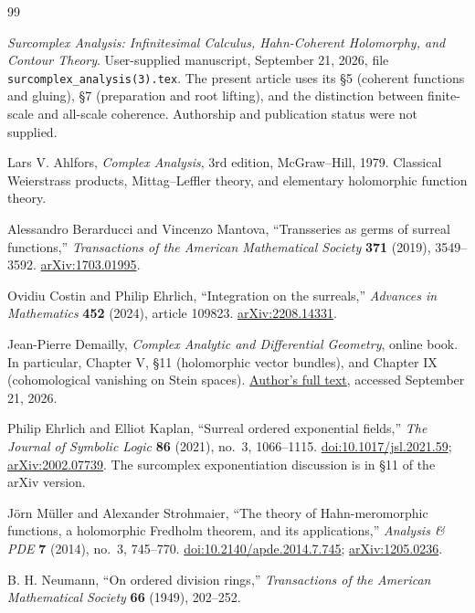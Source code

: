 \documentclass[11pt,letterpaper]{article}
\theoremstyle{definition}
\theoremstyle{remark}
\numberwithin{equation}{section}
\begin{document}
\begin{thebibliography}{99}

\emph{Surcomplex Analysis: Infinitesimal Calculus, Hahn-Coherent Holomorphy, and Contour Theory}.
User-supplied manuscript, September 21, 2026, file
\texttt{surcomplex\_analysis(3).tex}.
The present article uses its \S5 (coherent functions and gluing), \S7 (preparation and root lifting), and the distinction between finite-scale and all-scale coherence. Authorship and publication status were not supplied.

Lars V. Ahlfors,
\emph{Complex Analysis}, 3rd edition,
McGraw--Hill, 1979.
Classical Weierstrass products, Mittag--Leffler theory, and elementary holomorphic function theory.

Alessandro Berarducci and Vincenzo Mantova,
``Transseries as germs of surreal functions,''
\emph{Transactions of the American Mathematical Society} \textbf{371} (2019), 3549--3592.
\href{https://arxiv.org/abs/1703.01995}{arXiv:1703.01995}.

Ovidiu Costin and Philip Ehrlich,
``Integration on the surreals,''
\emph{Advances in Mathematics} \textbf{452} (2024), article 109823.
\href{https://arxiv.org/abs/2208.14331}{arXiv:2208.14331}.

Jean-Pierre Demailly,
\emph{Complex Analytic and Differential Geometry}, online book.
In particular, Chapter V, \S11 (holomorphic vector bundles), and Chapter IX (cohomological vanishing on Stein spaces).
\href{https://www-fourier.univ-grenoble-alpes.fr/~demailly/manuscripts/agbook.pdf}{Author's full text}, accessed September 21, 2026.

Philip Ehrlich and Elliot Kaplan,
``Surreal ordered exponential fields,''
\emph{The Journal of Symbolic Logic} \textbf{86} (2021), no.~3, 1066--1115.
\href{https://doi.org/10.1017/jsl.2021.59}{doi:10.1017/jsl.2021.59};
\href{https://arxiv.org/abs/2002.07739}{arXiv:2002.07739}.
The surcomplex exponentiation discussion is in \S11 of the arXiv version.

J\"orn M\"uller and Alexander Strohmaier,
``The theory of Hahn-meromorphic functions, a holomorphic Fredholm theorem, and its applications,''
\emph{Analysis \& PDE} \textbf{7} (2014), no.~3, 745--770.
\href{https://doi.org/10.2140/apde.2014.7.745}{doi:10.2140/apde.2014.7.745};
\href{https://arxiv.org/abs/1205.0236}{arXiv:1205.0236}.

B. H. Neumann,
``On ordered division rings,''
\emph{Transactions of the American Mathematical Society} \textbf{66} (1949), 202--252.


\end{thebibliography}
\end{document}

